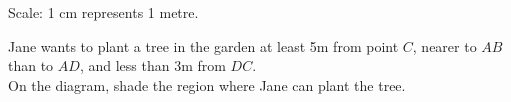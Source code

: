 \begin{enumerate}
\begin{figure}[H]
  \end{figure}
  Scale: 1 cm represents 1 metre.\par 
  Jane wants to plant a tree in the garden at least 5m from point $C$, nearer to $AB$ than to $AD$, and less than 3m from $DC$.\\
  On the diagram, shade the region where Jane can plant the tree.
\end{enumerate}